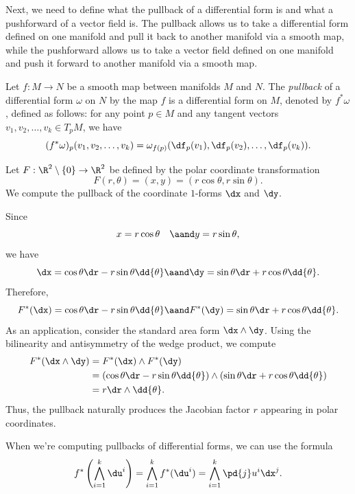 Next, we need to define what the pullback of a differential form is and what a pushforward of a vector field is. The pullback allows us to take a differential form defined on one manifold and pull it back to another manifold via a smooth map, while the pushforward allows us to take a vector field defined on one manifold and push it forward to another manifold via a smooth map.

\begin{definition}
  Let $f : M \to N$ be a smooth map between manifolds $M$ and $N$. The \emph{pullback} of a differential form $\omega$ on $N$ by the map $f$ is a differential form on $M$, denoted by $f^*\omega$, defined as follows: for any point $p \in M$ and any tangent vectors $v_1, v_2, \ldots, v_k \in T_pM$, we have
  \[%
    (f^*\omega)_p(v_1, v_2, \ldots, v_k) = \omega_{f(p)}(\df_p(v_1), \df_p(v_2), \ldots, \df_p(v_k))
  .\]%
\end{definition}

\begin{example}
  Let $F : \R^2 \setminus \{0\} \to \R^2$ be defined by the polar coordinate transformation
  \[%
    F(r,\theta) = (x,y) = (r\cos\theta, r\sin\theta)
  .\]%
  We compute the pullback of the coordinate $1$-forms $\dx$ and $\dy$.

  Since
  \[%
    x = r\cos\theta \quad \aand y = r\sin\theta
  ,\]%
  we have
  \[%
    \dx = \cos\theta \dr - r\sin\theta \dd{\theta} \aand \dy = \sin\theta \dr + r\cos\theta \dd{\theta}
  .\]%
  Therefore,
  \[%
    F^*(\dx) = \cos\theta \dr - r\sin\theta \dd{\theta} \aand F^*(\dy) = \sin\theta \dr + r\cos\theta \dd{\theta}
  .\]%
  As an application, consider the standard area form $\dx \wedge \dy$. Using the bilinearity and antisymmetry of the wedge product, we compute
  \begin{align*}
    F^*(\dx \wedge \dy) &= F^*(\dx) \wedge F^*(\dy) \\
                      &= (\cos\theta \dr - r\sin\theta \dd{\theta}) \wedge (\sin\theta \dr + r\cos\theta \dd{\theta}) \\
                      &= r \dr \wedge \dd{\theta}.
  \end{align*}
  Thus, the pullback naturally produces the Jacobian factor $r$ appearing in polar coordinates.
\end{example}

When we're computing pullbacks of differential forms, we can use the formula
\[%
  f^*\left(\bigwedge_{i=1}^k \du^i\right) = \bigwedge_{i=1}^k f^*(\du^i) = \bigwedge_{i=1}^k \pd{j} u^i \dx^j
.\]%

